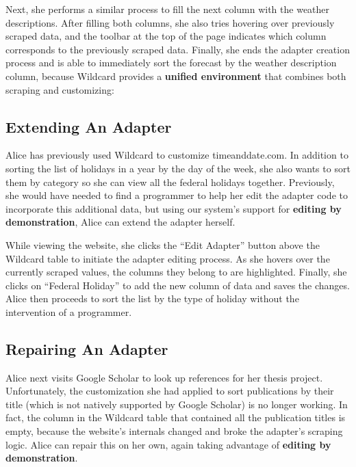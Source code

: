 \documentclass[sigconf,10pt]{acmart}
\begin{document}
Next, she performs a similar process to fill the next column with the
weather descriptions. After filling both columns, she also tries
hovering over previously scraped data, and the toolbar at the top of the
page indicates which column corresponds to the previously scraped data.
Finally, she ends the adapter creation process and is able to
immediately sort the forecast by the weather description column, because
Wildcard provides a \textbf{unified environment} that combines both
scraping and customizing:

\hypertarget{extending-an-adapter}{%
\subsection{Extending An Adapter}\label{extending-an-adapter}}

Alice has previously used Wildcard to customize timeanddate.com. In
addition to sorting the list of holidays in a year by the day of the
week, she also wants to sort them by category so she can view all the
federal holidays together. Previously, she would have needed to find a
programmer to help her edit the adapter code to incorporate this
additional data, but using our system's support for \textbf{editing by
demonstration}, Alice can extend the adapter herself.

While viewing the website, she clicks the ``Edit Adapter'' button above
the Wildcard table to initiate the adapter editing process. As she
hovers over the currently scraped values, the columns they belong to are
highlighted. Finally, she clicks on ``Federal Holiday'' to add the new
column of data and saves the changes. Alice then proceeds to sort the
list by the type of holiday without the intervention of a programmer.

\hypertarget{repairing-an-adapter}{%
\subsection{Repairing An Adapter}\label{repairing-an-adapter}}

Alice next visits Google Scholar to look up references for her thesis
project. Unfortunately, the customization she had applied to sort
publications by their title (which is not natively supported by Google
Scholar) is no longer working. In fact, the column in the Wildcard table
that contained all the publication titles is empty, because the
website's internals changed and broke the adapter's scraping logic.
Alice can repair this on her own, again taking advantage of
\textbf{editing by demonstration}.
\end{document}
